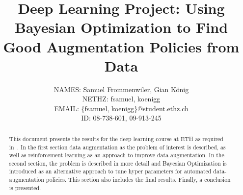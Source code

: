 \documentclass[10pt,twocolumn,letterpaper]{article}
\begin{document}
\title{Deep Learning Project: Using Bayesian Optimization to Find Good Augmentation Policies from Data}

\author{
    	\small{NAMES: Samuel Frommenwiler, Gian K\"onig} \\
   	\small{NETHZ: fsamuel, koenigg}\\
	\small{EMAIL: \{fsamuel, koenigg\}$@$student.ethz.ch}\\
    	\small{ID: 08-738-601, 09-913-245}
}

\maketitle

\begin{abstract}
This document presents the results for the deep learning course at ETH as required in~\cite{DL18}. In the first section data augmentation as the problem of interest is described, as well as reinforcement learning as an approach to improve data augmentation. In the second section, the problem is described in more detail and Bayesian Optimization is introduced as an alternative approach to tune hyper parameters for automated data-augmentation policies. This section also includes the final results. Finally, a conclusion is presented. 
\end{abstract}

\end{document}
